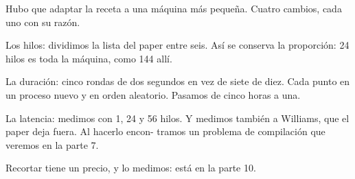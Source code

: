 Hubo que adaptar la receta a una máquina más pequeña. Cuatro cambios, cada uno con su razón.

Los hilos: dividimos la lista del paper entre seis. Así se conserva la proporción: 24 hilos es toda la máquina, como 144 allí.

La duración: cinco rondas de dos segundos en vez de siete de diez. Cada punto en un proceso nuevo y en orden aleatorio. Pasamos de cinco horas a una.

La latencia: medimos con 1, 24 y 56 hilos. Y medimos también a Williams, que el paper deja fuera. Al hacerlo encon- tramos un problema de compilación que veremos en la parte 7.

Recortar tiene un precio, y lo medimos: está en la parte 10.
